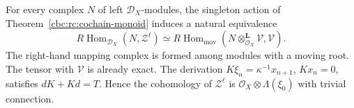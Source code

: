 \begin{theorem}\label{cbc:rc:moving-endomorphisms}
For every complex $N$ of left $\mathcal D_X$-modules, the
singleton action of Theorem~\ref{cbc:rc:cochain-monoid}
induces a natural equivalence
\begin{equation}\label{cbc:rc:moving-adjunction}
 R\operatorname{Hom}_{\mathcal D_X}(N,\mathcal Z^\ell)
 \simeq
 R\operatorname{Hom}_{\mathrm{mov}}
 (N\otimes_{\mathcal O_X}^{\mathbf L}\mathcal V,\mathcal V).
\end{equation}
The right-hand mapping complex is formed among modules with
a moving root. The tensor with $\mathcal V$ is already exact.
The derivation $K\xi_n=\kappa^{-1}x_{n+1}$, $Kx_n=0$,
satisfies $dK+Kd=T$. Hence the cohomology of $\mathcal Z^\ell$
is $\mathcal O_X\otimes\Lambda(\xi_0)$ with trivial connection.
\end{theorem}
